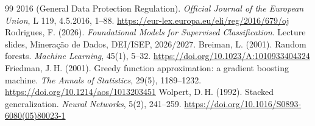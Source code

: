 \documentclass[12pt,a4paper,openany]{report}
\begin{document}
\begin{thebibliography}{99}
  2016 (General Data Protection Regulation). \emph{Official Journal of the European Union}, L 119, 4.5.2016,
  1--88. \url{https://eur-lex.europa.eu/eli/reg/2016/679/oj}
 Rodrigues, F. (2026). \emph{Foundational Models for Supervised Classification}. Lecture slides,
  Mineração de Dados, DEI/ISEP, 2026/2027.
 Breiman, L. (2001). Random forests. \emph{Machine Learning}, 45(1), 5--32.
  \url{https://doi.org/10.1023/A:1010933404324}
 Friedman, J.\,H. (2001). Greedy function approximation: a gradient boosting machine.
  \emph{The Annals of Statistics}, 29(5), 1189--1232. \url{https://doi.org/10.1214/aos/1013203451}
 Wolpert, D.\,H. (1992). Stacked generalization. \emph{Neural Networks}, 5(2), 241--259.
  \url{https://doi.org/10.1016/S0893-6080(05)80023-1}
\end{thebibliography}
\end{document}
